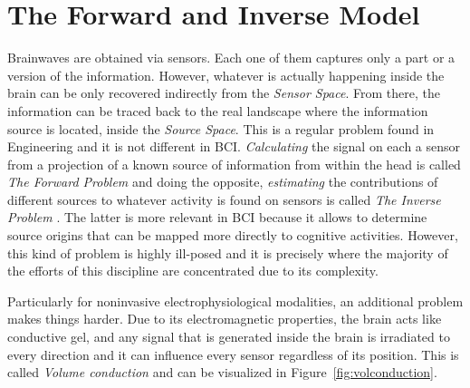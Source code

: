 %

\section{The Forward and Inverse Model}

Brainwaves are obtained via sensors. Each one of them captures only a part or a version of the information.  However, whatever is actually happening inside the brain can be only recovered indirectly from the \textit{Sensor Space}. From there, the information can be traced back to the real landscape where the information source is located, inside the \textit{Source Space}.  This is a regular problem found in Engineering and it is not different in BCI.  \textit{Calculating} the signal on each a sensor from a projection of a known source of information from within the head is called \textit{The Forward Problem}\cite{Parra2008,WolpawJonathanR2012}  and doing the opposite, \textit{estimating} the contributions of different sources to whatever activity is found on sensors is called  \textit{The Inverse Problem} .  The latter is more relevant in BCI because it allows to determine source origins that can be mapped more directly to cognitive activities.  However, this kind of problem is highly ill-posed and it is precisely where the majority of the efforts of this discipline are concentrated due to its complexity.

Particularly for noninvasive electrophysiological modalities, an additional problem makes things harder.  Due to its electromagnetic properties, the brain acts like conductive gel, and any signal that is generated inside the brain is irradiated to every direction and it can influence every sensor regardless of its position.  This is called \textit{Volume conduction} \cite{Nam2018,Buzsaki2012} and can be visualized in Figure~\ref{fig:volconduction}.

